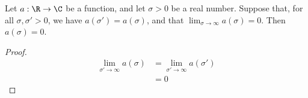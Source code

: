 \begin{lemma}[limitOfConstant]
\label{limitOfConstant}
\leanok
Let $a:\R\to\C$ be a function, and let $\sigma>0$ be a real number. Suppose that, for all
  $\sigma, \sigma'>0$, we have $a(\sigma')=a(\sigma)$, and that
  $\lim_{\sigma\to\infty}a(\sigma)=0$. Then $a(\sigma)=0$.
\end{lemma}
\begin{proof}
\leanok
\begin{align*}
  \lim_{\sigma'\to\infty}a(\sigma) &= \lim_{\sigma'\to\infty}a(\sigma') \\
  &= 0
  \end{align*}
\end{proof}
